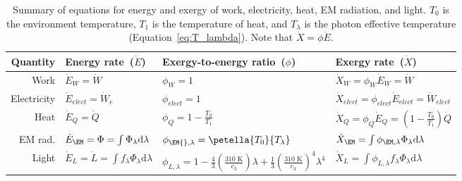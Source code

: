 

\begin{table}
\centering %
\caption{Summary of equations for energy and exergy of work, electricity, heat, EM radiation, and light.
         $T_0$ is the environment temperature, $T_1$ is the temperature of heat, 
         and $T_\lambda$ is the photon effective temperature
         (Equation~\ref{eq:T_lambda}).
         Note that $\dot{X} = \phi \dot{E}$.}
\begin{tabular}{r l l l}
  \toprule
  Quantity 
      & Energy rate~($\dot{E}$) 
      & Exergy-to-energy ratio~($\phi$) 
      & Exergy rate~($\dot{X}$) \\
  \midrule
  Work        
      & $\dot{E}_W = \dot{W}$
      & $\phi_W = 1$
      & $\dot{X}_W = \phi_W \dot{E}_W = \dot{W}$ \\
  Electricity 
      & $\dot{E}_{elect} = \dot{W}_e$
      & $\phi_{elect} = 1$
      & $\dot{X}_{elect} = \phi_{elect} \dot{E}_{elect} = \dot{W}_{elect}$ \\
  Heat 
      & $\dot{E}_Q = \dot{Q}$   
      & $\phi_Q = 1 - \frac{T_0}{T_1}$  
      & $ \dot{X}_Q = \phi_Q \dot{E}_Q = \left( 1 - \frac{T_0}{T_1} \right) \dot{Q}  $ \\
  EM rad.
      & $\dot{E}_{\EM} = \Phi = \int \Phi_\lambda \mathrm{d}\lambda$ 
      & $\phi_{\EM{},\lambda} = \petella{T_0}{T_\lambda}$ 
      & $\dot{X}_{\EM} = \int \phi_{\EM,\lambda} \Phi_\lambda \mathrm{d}\lambda$ \\
  Light
      & $\dot{E}_L = \dot{L} = \int f_\lambda \Phi_\lambda \mathrm{d}\lambda$
      & $\phi_{L,\lambda} = 1 
                            - \frac{4}{3} \left( \frac{310 \text{ K}}{c_3} \right) \lambda 
                            + \frac{1}{3} \left( \frac{310 \text{ K}}{c_3} \right)^4 \lambda^4$ %
      & $\dot{X}_L = \int \phi_{L,\lambda} f_\lambda \Phi_\lambda \mathrm{d}\lambda$ \\
  \bottomrule
\end{tabular}
\label{tab:EX_summary}
\end{table}



